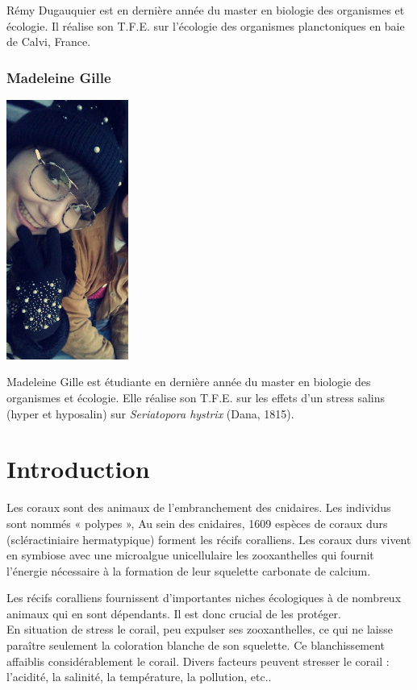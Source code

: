 \documentclass[]{report}
\begin{document}
Rémy Dugauquier est en dernière année du master en biologie des
organismes et écologie. Il réalise son T.F.E. sur l'écologie des
organismes planctoniques en baie de Calvi, France.

\subsection{Madeleine Gille}\label{madeleine-gille}

\includegraphics[width=4.00000cm]{../image/madeleine.jpg}

Madeleine Gille est étudiante en dernière année du master en biologie
des organismes et écologie. Elle réalise son T.F.E. sur les effets d'un
stress salins (hyper et hyposalin) sur \emph{Seriatopora hystrix} (Dana,
1815).

\chapter{Introduction}\label{introduction}

Les coraux sont des animaux de l'embranchement des cnidaires. Les
individus sont nommés « polypes », Au sein des cnidaires, 1609 espèces
de coraux durs (scléractiniaire hermatypique) forment les récifs
coralliens. Les coraux durs vivent en symbiose avec une microalgue
unicellulaire les zooxanthelles qui fournit l'énergie nécessaire à la
formation de leur squelette carbonate de calcium.

Les récifs coralliens fournissent d'importantes niches écologiques à de
nombreux animaux qui en sont dépendants. Il est donc crucial de les
protéger.\\
En situation de stress le corail, peu expulser ses zooxanthelles, ce qui
ne laisse paraître seulement la coloration blanche de son squelette. Ce
blanchissement affaiblis considérablement le corail. Divers facteurs
peuvent stresser le corail : l'acidité, la salinité, la température, la
pollution, etc..
\end{document}
